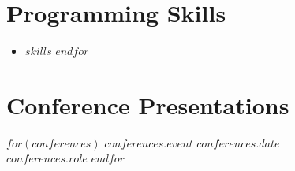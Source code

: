 \documentclass[$fontsize$, a4paper]{article}
\begin{document}
\vspace{8pt}

\section*{Programming Skills}
\begin{itemize}
$for(skills)$
\item $skills$
$endfor$
\end{itemize}

\vspace{8pt}

\section*{Conference Presentations}
\begin{multicols}{2}
$for(conferences)$
\textbf{$conferences.event$} \hfill \textit{$conferences.date$}\\
\emph{$conferences.role$}
\vspace{6pt}
$endfor$
\end{multicols}
\end{document}
